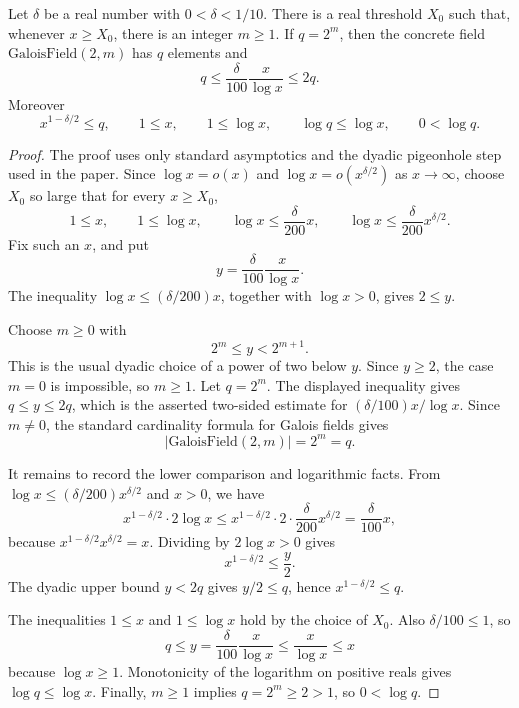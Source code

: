 \begin{helper}
Let \(\delta\) be a real number with \(0<\delta<1/10\).  There is a real
threshold \(X_0\) such that, whenever \(x\ge X_0\), there is an integer
\(m\ge1\).  If \(q=2^m\), then the concrete field
\(\mathrm{GaloisField}(2,m)\) has \(q\) elements and
\[
  q\le \frac{\delta}{100}\frac{x}{\log x}\le 2q.
\]
Moreover
\[
  x^{1-\delta/2}\le q,\qquad
  1\le x,\qquad 1\le\log x,\qquad
  \log q\le\log x,\qquad 0<\log q.
\]
\end{helper}
\begin{proof}
The proof uses only standard asymptotics and the dyadic pigeonhole step used
in the paper.  Since \(\log x=o(x)\) and
\(\log x=o(x^{\delta/2})\) as \(x\to\infty\), choose \(X_0\) so large that
for every \(x\ge X_0\),
\[
  1\le x,\qquad 1\le\log x,\qquad
  \log x\le \frac{\delta}{200}x,\qquad
  \log x\le \frac{\delta}{200}x^{\delta/2}.
\]
Fix such an \(x\), and put
\[
  y=\frac{\delta}{100}\frac{x}{\log x}.
\]
The inequality \(\log x\le(\delta/200)x\), together with \(\log x>0\), gives
\(2\le y\).

Choose \(m\ge0\) with
\[
  2^m\le y<2^{m+1}.
\]
This is the usual dyadic choice of a power of two below \(y\).  Since
\(y\ge2\), the case \(m=0\) is impossible, so \(m\ge1\).  Let \(q=2^m\).
The displayed inequality gives \(q\le y\le2q\), which is the asserted
two-sided estimate for \((\delta/100)x/\log x\).  Since \(m\ne0\), the
standard cardinality formula for Galois fields gives
\[
  |\mathrm{GaloisField}(2,m)|=2^m=q.
\]

It remains to record the lower comparison and logarithmic facts.  From
\(\log x\le(\delta/200)x^{\delta/2}\) and \(x>0\), we have
\[
  x^{1-\delta/2}\cdot 2\log x
    \le x^{1-\delta/2}\cdot 2\cdot\frac{\delta}{200}x^{\delta/2}
    = \frac{\delta}{100}x,
\]
because \(x^{1-\delta/2}x^{\delta/2}=x\).  Dividing by \(2\log x>0\) gives
\[
  x^{1-\delta/2}\le \frac{y}{2}.
\]
The dyadic upper bound \(y<2q\) gives \(y/2\le q\), hence
\(x^{1-\delta/2}\le q\).

The inequalities \(1\le x\) and \(1\le\log x\) hold by the choice of \(X_0\).
Also \(\delta/100\le1\), so
\[
  q\le y=\frac{\delta}{100}\frac{x}{\log x}\le \frac{x}{\log x}\le x
\]
because \(\log x\ge1\).  Monotonicity of the logarithm on positive reals gives
\(\log q\le\log x\).  Finally, \(m\ge1\) implies \(q=2^m\ge2>1\), so
\(0<\log q\).
\end{proof}
